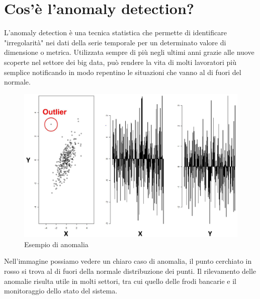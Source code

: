\section{Cos'è l'anomaly detection?}
L'anomaly detection è una tecnica statistica che permette di identificare "irregolarità" nei dati della serie temporale per un determinato valore di dimensione o metrica. 
Utilizzata sempre di più negli ultimi anni grazie alle nuove scoperte nel settore dei big data, può rendere la vita di molti lavoratori più semplice notificando in modo repentino le situazioni che vanno al di fuori del normale.
\newpage
\begin{figure}[h!]
	\centering
	\includegraphics[scale=0.1]{figures/anomaly_detection_example}
	\caption[Esempio di anomalia.]{Esempio di anomalia \cite{anomalydetection}
		\label{fig:logoGCP}}
\end{figure}	

Nell'immagine possiamo vedere un chiaro caso di anomalia, il punto cerchiato in rosso si trova al di fuori della normale distribuzione dei punti.
Il rilevamento delle anomalie risulta utile in molti settori, tra cui quello delle frodi bancarie e il monitoraggio dello stato del sistema. 
